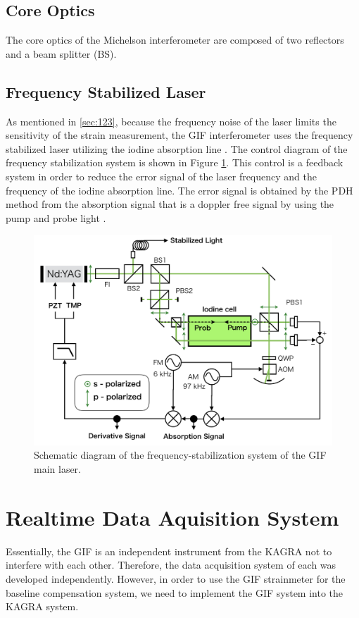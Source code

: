 \subsection{Core Optics}
The core optics of the Michelson interferometer are composed of two reflectors and a beam splitter (BS). 


\subsection{Frequency Stabilized Laser} \label{sec:sec135}
As mentioned in \cref{sec:123}, because the frequency noise of the laser limits the sensitivity of the strain measurement, the GIF interferometer uses the frequency stabilized laser utilizing the iodine absorption line \cite{araya2002iodine}. The control diagram of the frequency stabilization system is shown in Figure \ref{img:img417}. This control is a feedback system in order to reduce the error signal of the laser frequency and the frequency of the iodine absorption line. The error signal is obtained by the PDH method from the absorption signal that is a doppler free signal by using the pump and probe light \cite{snyder1980high}.
\begin{figure}[h]
  \begin{center}   
    \includegraphics[width=12cm]{./img_chap4/img417.png}
    \caption{Schematic diagram of the frequency-stabilization system of the GIF main laser.}\label{img:img417}
  \end{center}
\end{figure}




\section{Realtime Data Aquisition System} \label{sec:sec44}
Essentially, the GIF is an independent instrument from the KAGRA not to interfere with each other. Therefore, the data acquisition system of each was developed independently. However, in order to use the GIF strainmeter for the baseline compensation system, we need to implement the GIF system into the KAGRA system. 

